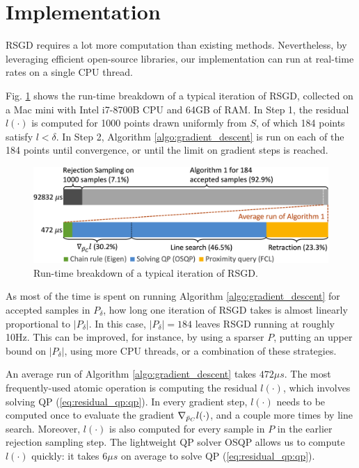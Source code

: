 \section{Implementation}
RSGD requires a lot more computation than existing methods. Nevertheless, by leveraging efficient open-source libraries, our implementation can run at real-time rates on a single CPU thread.

Fig. \ref{fig:run_time} shows the run-time breakdown of a typical iteration of RSGD, collected on a Mac mini with Intel i7-8700B CPU and 64GB of RAM. In Step 1, the residual $l(\cdot)$ is computed for 1000 points drawn uniformly from $S$, of which 184 points satisfy $l < \delta$. In Step 2, Algorithm \ref{algo:gradient_descent} is run on each of the 184 points until convergence, or until the limit on gradient steps is reached.
\begin{figure}[h]
\centering
\includegraphics[width=\linewidth]{figures/05_force_from_torque/run_time.png}
\caption{Run-time breakdown of a typical iteration of RSGD.}
\label{fig:run_time}
\end{figure}

As most of the time is spent on running Algorithm \ref{algo:gradient_descent} for accepted samples in $P_\delta$, how long one iteration of RSGD takes is almost linearly proportional to $|P_\delta|$. In this case, $|P_\delta|=184$ leaves RSGD running at roughly 10Hz. This can be improved, for instance, by using a sparser $P$, putting an upper bound on $|P_\delta|$, using more CPU threads, or a combination of these strategies. 

An average run of Algorithm \ref{algo:gradient_descent} takes $472 \mu s$. The most frequently-used atomic operation is computing the residual $l(\cdot)$, which involves solving QP (\ref{eq:residual_qp:qp}). In every gradient step, $l(\cdot)$ needs to be computed once to evaluate the gradient $\nabla_{\bar{p}_C} l(\cdot)$, and a couple more times by line search. Moreover, $l(\cdot)$ is also computed for every sample in $P$ in the earlier rejection sampling step. The lightweight QP solver OSQP\cite{stellato2020osqp} allows us to compute $l(\cdot)$ quickly: it takes $6\mu s$ on average to solve QP (\ref{eq:residual_qp:qp}). 

